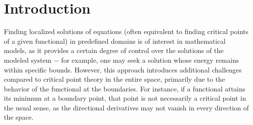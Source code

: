 \documentclass{birkjour}
\theoremstyle{definition}
\theoremstyle{remark}
\numberwithin{equation}{section}
\begin{document}






\begin{abstract}
In the paper, results on the existence of critical points in annular subsets
of a cone are obtained with the additional goal of obtaining multiplicity
results. Compared to other approaches in the literature based on the use of
Krasnoselskii's compression-extension theorem or topological index methods,
our approach uses the Nehari manifold technique in a surprising combination
with the cone version of Birkhoff-Kellogg's invariant-direction theorem.
This yields a simpler alternative to traditional methods involving
deformation arguments or Ekeland's variational principle. The new method is
illustrated on a boundary value problem for $p$-Laplace equations, and we
believe that it will be useful for proving the existence, localization, and
multiplicity of solutions for other classes of problems with variational
structure.
\end{abstract}

\maketitle
\section{Introduction}

Finding localized solutions of equations (often equivalent to finding
critical points of a given functional) in predefined domains is of interest
in mathematical models, as it provides a certain degree of control over the
solutions of the modeled system $-$ for example, one may seek a solution
whose energy remains within specific bounds. However, this approach
introduces additional challenges compared to critical point theory in the
entire space, primarily due to the behavior of the functional at the
boundaries. For instance, if a functional attains its minimum at a boundary
point, that point is not necessarily a critical point in the usual sense, as
the directional derivatives may not vanish in every direction of the space.
\end{document}
